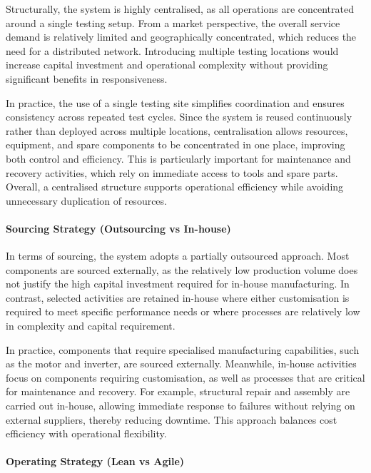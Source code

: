 \documentclass[a4paper,11pt]{article}
\begin{document}
Structurally, the system is highly centralised, as all operations are concentrated around a single testing setup. From a market perspective, the overall service demand is relatively limited and geographically concentrated, which reduces the need for a distributed network. Introducing multiple testing locations would increase capital investment and operational complexity without providing significant benefits in responsiveness.

In practice, the use of a single testing site simplifies coordination and ensures consistency across repeated test cycles. Since the system is reused continuously rather than deployed across multiple locations, centralisation allows resources, equipment, and spare components to be concentrated in one place, improving both control and efficiency. This is particularly important for maintenance and recovery activities, which rely on immediate access to tools and spare parts. Overall, a centralised structure supports operational efficiency while avoiding unnecessary duplication of resources.

\paragraph{Sourcing Strategy (Outsourcing vs In-house)}

In terms of sourcing, the system adopts a partially outsourced approach. Most components are sourced externally, as the relatively low production volume does not justify the high capital investment required for in-house manufacturing. In contrast, selected activities are retained in-house where either customisation is required to meet specific performance needs or where processes are relatively low in complexity and capital requirement.

In practice, components that require specialised manufacturing capabilities, such as the motor and inverter, are sourced externally. Meanwhile, in-house activities focus on components requiring customisation, as well as processes that are critical for maintenance and recovery. For example, structural repair and assembly are carried out in-house, allowing immediate response to failures without relying on external suppliers, thereby reducing downtime. This approach balances cost efficiency with operational flexibility.

\paragraph{Operating Strategy (Lean vs Agile)}
\end{document}
